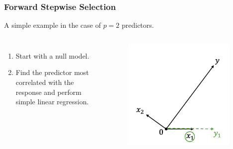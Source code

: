 \begin{frame}
\frametitle{Forward Stepwise Selection}
A simple example in the case of $p=2$ predictors.

\begin{columns}
    \begin{enumerate}
        \item Start with a null model.
        \item Find the predictor most correlated with the response and perform simple linear regression.
    \end{enumerate}
    
    \begin{figure}[!htbp]
        \begin{center}
            \includegraphics[width=0.95\textwidth]{img/FStepR/2.jpeg}
        \end{center}
    \end{figure}
    \end{columns}
\end{frame}

